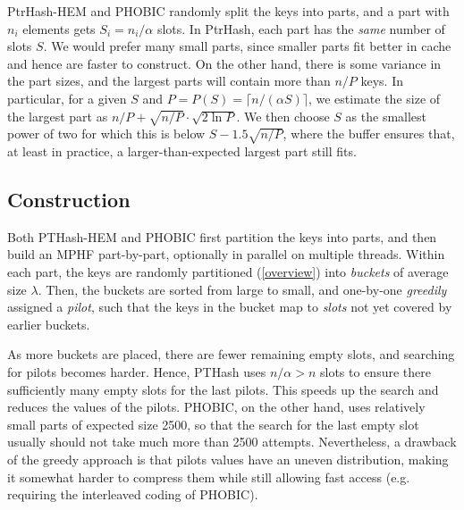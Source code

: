\documentclass[a4paper,UKenglish,cleveref,thm-restate]{lipics-v2021}
\begin{document}
PtrHash-HEM and PHOBIC randomly split the keys into parts, and a part with \(n_i\)
elements gets \(S_i=n_i/\alpha\) slots. In PtrHash, each part has the \emph{same}
number of slots \(S\). We would prefer many small parts, since
smaller parts fit better in cache and hence are faster to construct.
On the other hand, there is some variance in the part sizes, and the largest
parts will contain more than \(n/P\) keys.
In particular, for a given \(S\) and \(P=P(S)=\lceil n/(\alpha S)\rceil\), we estimate the size of the largest part as \(n/P +
\sqrt{n/P}\cdot \sqrt{2 \ln P}\). We then choose \(S\) as the smallest power of two for
which this is below \(S-1.5\sqrt{n/P}\), where the buffer ensures that, at least
in practice, a larger-than-expected largest part still fits.


\subsection{Construction}
\label{sec:construction}
Both PTHash-HEM and PHOBIC first partition the keys into parts, and then build
an MPHF part-by-part, optionally in parallel on multiple threads.
Within each part, the keys are randomly partitioned (\cref{overview}) into
\emph{buckets} of average size \(\lambda\).
Then, the buckets are sorted from large to small, and one-by-one \emph{greedily} assigned a
\emph{pilot}, such that the keys in the bucket map to \emph{slots} not yet covered by earlier buckets.

As more buckets are placed, there are fewer remaining empty slots, and searching for pilots becomes harder.
Hence, PTHash uses \(n/\alpha > n\) slots
to ensure there sufficiently many empty slots for the last pilots. This speeds
up the search and reduces the values of the pilots.
PHOBIC, on the other hand, uses relatively small parts of expected size 2500, so that
the search for the last empty slot usually should not take much more than 2500 attempts.
Nevertheless, a drawback of the greedy approach is that pilots values have an uneven
distribution, making it somewhat harder to compress them while still allowing
fast access (e.g. requiring the interleaved coding of PHOBIC).
\end{document}
